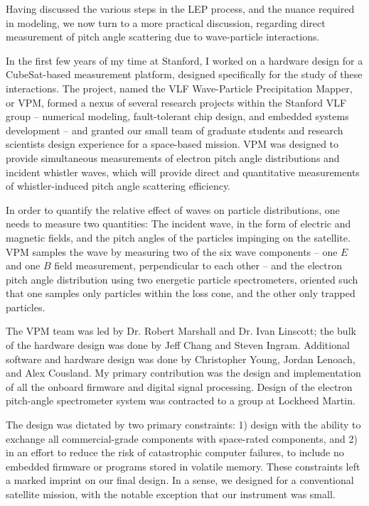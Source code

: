 Having discussed the various steps in the LEP process, and the nuance required in modeling, we now turn to a more practical discussion, regarding direct measurement of pitch angle scattering due to wave-particle interactions. 

In the first few years of my time at Stanford, I worked on a hardware design for a CubeSat-based measurement platform, designed specifically for the study of these interactions. The project, named the VLF Wave-Particle Precipitation Mapper, or VPM, formed a nexus of several research projects within the Stanford VLF group -- numerical modeling, fault-tolerant chip design, and embedded systems development -- and granted our small team of graduate students and research scientists design experience for a space-based mission. VPM was designed to provide simultaneous measurements of electron pitch angle distributions and incident whistler waves, which will provide direct and quantitative measurements of whistler-induced pitch angle scattering efficiency.

In order to quantify the relative effect of waves on particle distributions, one needs to measure two quantities: The incident wave, in the form of electric and magnetic fields, and the pitch angles of the particles impinging on the satellite. VPM samples the wave by measuring two of the six wave components -- one $E$ and one $B$ field measurement, perpendicular to each other -- and the electron pitch angle distribution using two energetic particle spectrometers, oriented such that one samples only particles within the loss cone, and the other only trapped particles.

The VPM team was led by Dr. Robert Marshall and Dr. Ivan Linscott; the bulk of the hardware design was done by Jeff Chang and Steven Ingram. Additional software and hardware design was done by Christopher Young, Jordan Lenoach, and Alex Cousland. My primary contribution was the design and implementation of all the onboard firmware and digital signal processing. Design of the electron pitch-angle spectrometer system was contracted to a group at Lockheed Martin.

The design was dictated by two primary constraints: 1) design with the ability to exchange all commercial-grade components with space-rated components, and 2) in an effort to reduce the risk of catastrophic computer failures, to include no embedded firmware or programs stored in volatile memory. These constraints left a marked imprint on our final design. In a sense, we designed for a conventional satellite mission, with the notable exception that our instrument was small.

